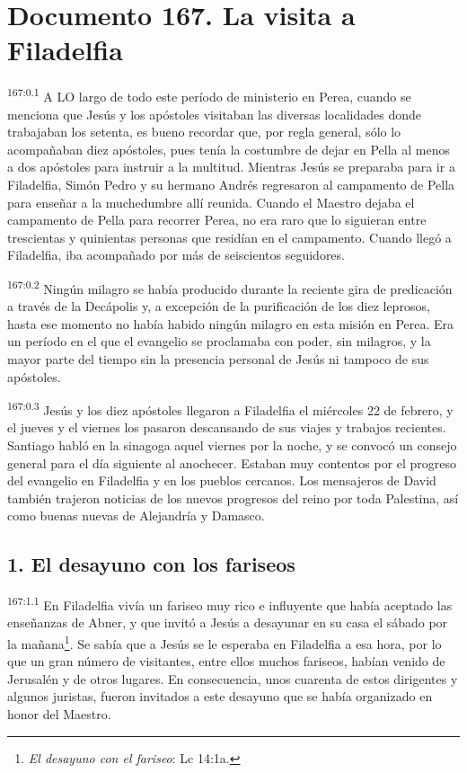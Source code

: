 \chapter{Documento 167. La visita a Filadelfia}
\par 
\textsuperscript{167:0.1} A LO largo de todo este período de ministerio en Perea, cuando se menciona que Jesús y los apóstoles visitaban las diversas localidades donde trabajaban los setenta, es bueno recordar que, por regla general, sólo lo acompañaban diez apóstoles, pues tenía la costumbre de dejar en Pella al menos a dos apóstoles para instruir a la multitud. Mientras Jesús se preparaba para ir a Filadelfia, Simón Pedro y su hermano Andrés regresaron al campamento de Pella para enseñar a la muchedumbre allí reunida. Cuando el Maestro dejaba el campamento de Pella para recorrer Perea, no era raro que lo siguieran entre trescientas y quinientas personas que residían en el campamento. Cuando llegó a Filadelfia, iba acompañado por más de seiscientos seguidores.

\par 
\textsuperscript{167:0.2} Ningún milagro se había producido durante la reciente gira de predicación a través de la Decápolis y, a excepción de la purificación de los diez leprosos, hasta ese momento no había habido ningún milagro en esta misión en Perea. Era un período en el que el evangelio se proclamaba con poder, sin milagros, y la mayor parte del tiempo sin la presencia personal de Jesús ni tampoco de sus apóstoles.

\par 
\textsuperscript{167:0.3} Jesús y los diez apóstoles llegaron a Filadelfia el miércoles 22 de febrero, y el jueves y el viernes los pasaron descansando de sus viajes y trabajos recientes. Santiago habló en la sinagoga aquel viernes por la noche, y se convocó un consejo general para el día siguiente al anochecer. Estaban muy contentos por el progreso del evangelio en Filadelfia y en los pueblos cercanos. Los mensajeros de David también trajeron noticias de los nuevos progresos del reino por toda Palestina, así como buenas nuevas de Alejandría y Damasco.

\section*{1. El desayuno con los fariseos}
\par 
\textsuperscript{167:1.1} En Filadelfia vivía un fariseo muy rico e influyente que había aceptado las enseñanzas de Abner, y que invitó a Jesús a desayunar en su casa el sábado por la mañana\footnote{\textit{El desayuno con el fariseo}: Lc 14:1a.}. Se sabía que a Jesús se le esperaba en Filadelfia a esa hora, por lo que un gran número de visitantes, entre ellos muchos fariseos, habían venido de Jerusalén y de otros lugares. En consecuencia, unos cuarenta de estos dirigentes y algunos juristas, fueron invitados a este desayuno que se había organizado en honor del Maestro.

